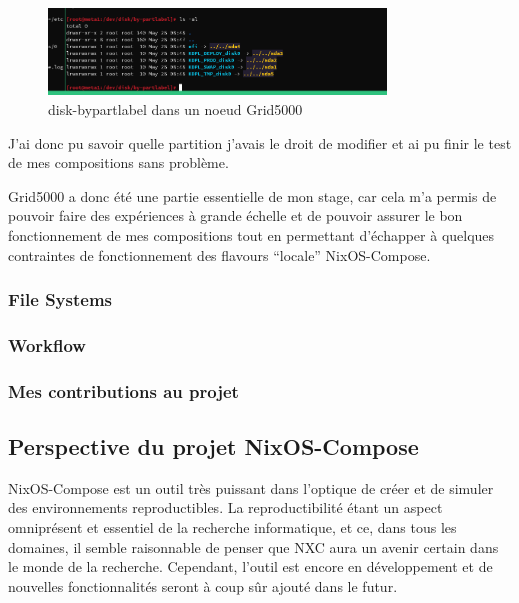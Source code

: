 \documentclass[a4paper,french,12pt, titlepage]{article}
\begin{document}
\begin{figure}[h]
\centering
\includegraphics[width=0.8\textwidth,height=0.8\textheight,keepaspectratio]{annexe/disk_g5k.png}
\caption{disk-bypartlabel dans un noeud Grid5000}
\end{figure}

J'ai donc pu savoir quelle partition j'avais le droit de modifier et ai
pu finir le test de mes compositions sans problème.\newline

Grid5000 a donc été une partie essentielle de mon stage, car cela m'a
permis de pouvoir faire des expériences à grande échelle et de pouvoir
assurer le bon fonctionnement de mes compositions tout en permettant
d'échapper à quelques contraintes de fonctionnement des flavours
``locale'' NixOS-Compose.\newline

\hypertarget{file-systems}{%
\subsubsection{File Systems}\label{file-systems}}

\hypertarget{workflow}{%
\subsubsection{Workflow}\label{workflow}}

\hypertarget{mes-contributions-au-projet}{%
\subsubsection{Mes contributions au
projet}\label{mes-contributions-au-projet}}

\newpage

\hypertarget{perspective-du-projet-nixos-compose}{%
\subsection{Perspective du projet
NixOS-Compose}\label{perspective-du-projet-nixos-compose}}

NixOS-Compose est un outil très puissant dans l'optique de créer et de
simuler des environnements reproductibles. La reproductibilité étant un
aspect omniprésent et essentiel de la recherche informatique, et ce,
dans tous les domaines, il semble raisonnable de penser que NXC aura un
avenir certain dans le monde de la recherche. Cependant, l'outil est
encore en développement et de nouvelles fonctionnalités seront à coup
sûr ajouté dans le futur.
\end{document}
